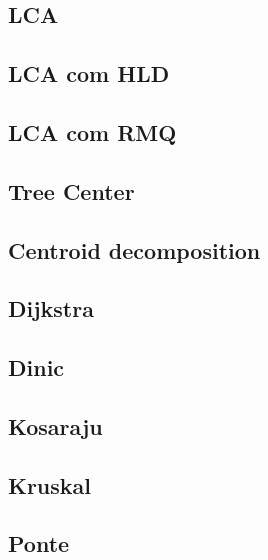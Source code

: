 \documentclass[12pt, a4paper, twoside]{article}
\begin{document}
\subsection{LCA}


\subsection{LCA com HLD}


\subsection{LCA com RMQ}


\subsection{Tree Center}


\subsection{Centroid decomposition}


\subsection{Dijkstra}


\subsection{Dinic}


\subsection{Kosaraju}


\subsection{Kruskal}


\subsection{Ponte}

\end{document}
